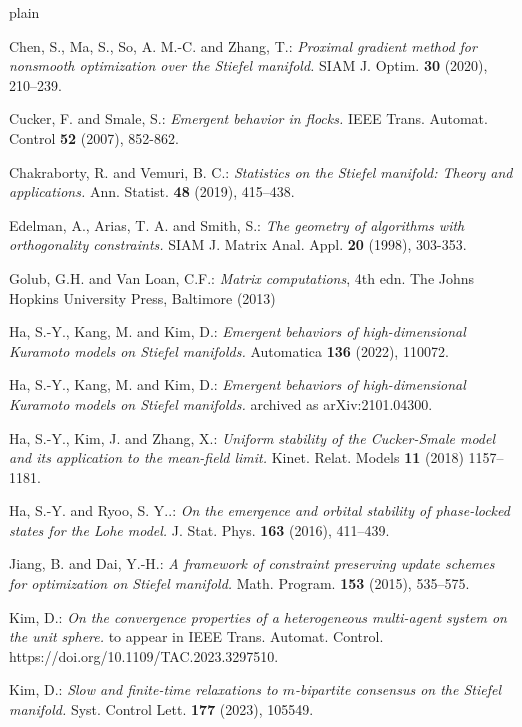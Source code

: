 \documentclass[11pt,reqno]{amsart}
\numberwithin{figure}{section}
\begin{document}
 


 

 \begin{thebibliography}{plain}
 
  Chen, S., Ma, S., So, A. M.-C. and Zhang, T.: \textit{Proximal gradient method for nonsmooth optimization over the Stiefel manifold.} SIAM J. Optim. {\bf30} (2020), 210--239.
 
 
 Cucker, F. and Smale, S.: \textit{Emergent behavior in flocks.} IEEE Trans. Automat. Control {\bf52} (2007), 852-862. 

 Chakraborty, R. and Vemuri, B. C.: \textit{Statistics on the Stiefel manifold: Theory and applications.} Ann. Statist. {\bf48} (2019), 415--438. 


 Edelman, A., Arias, T. A. and Smith, S.: \textit{The geometry of algorithms with orthogonality constraints.} SIAM J. Matrix Anal. Appl. {\bf20} (1998), 303-353. 


 Golub, G.H. and Van Loan, C.F.: \textit{Matrix computations}, 4th edn. The Johns Hopkins University Press, Baltimore (2013)

  Ha, S.-Y., Kang, M. and Kim, D.: \textit{Emergent behaviors of high-dimensional Kuramoto models on Stiefel manifolds.} Automatica {\bf 136} (2022), 110072.

 Ha, S.-Y., Kang, M. and Kim, D.: \textit{Emergent behaviors of high-dimensional Kuramoto models on Stiefel manifolds.} archived as arXiv:2101.04300. 

 Ha, S.-Y., Kim, J. and Zhang, X.: \textit{Uniform stability of the Cucker-Smale model and its application to the mean-field limit.} Kinet. Relat. Models {\bf11} (2018) 1157– 1181.

 Ha, S.-Y. and Ryoo, S. Y..: \textit{On the emergence and orbital stability of phase-locked states for the Lohe model.} J. Stat. Phys. {\bf163} (2016), 411--439.

 Jiang, B. and Dai, Y.-H.: \textit{A framework of constraint preserving update schemes for optimization on Stiefel manifold.} Math. Program. {\bf153} (2015), 535--575. 

 Kim, D.: \textit{On the convergence properties of a heterogeneous multi-agent system on the unit sphere.} to appear in IEEE Trans. Automat. Control. https://doi.org/10.1109/TAC.2023.3297510. 

 Kim, D.: \textit{Slow and finite-time relaxations to $m$-bipartite consensus on the Stiefel manifold.} Syst. Control Lett. {\bf177} (2023), 105549.


\end{thebibliography}
\end{document}
